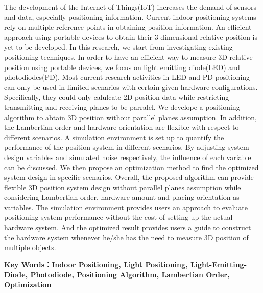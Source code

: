 \begin{abstractEN}

    The development of the Internet of Things(IoT) increases the demand of sensors and data, especially positioning information. Current indoor positioning systems rely on multiple reference points in obtaining position information. An  efficient approach using portable devices to obtain their 3-dimensional relative position is yet to be developed. In this research, we start from investigating existing positioning techniques. In order to have an efficient way to measure 3D relative position using portable devices, we focus on light emitting diode(LED) and photodiodes(PD). Most current research activities in LED and PD positioning can only be used in limited scenarios with certain given hardware configurations. Specifically, they could only calulcate 2D position data while restricting transmitting and receiving planes to be parralel. We develope a positioning algorithm to abtain 3D position without parallel planes assumption. In addition, the Lambertian order and hardware orientation are flexible with respect to different scenarios. A simulation environment is set up to quantify the performance of the position system in different scenarios. By adjusting system design variables and simulated noise respectively, the influence of each variable can be discussed. We then propose an optimization method to find the optimized system design in specific scenarios. Overall, the proposed algorithm can provide flexible 3D position system design without parallel planes assumption while considering Lambertian order, hardware amount and placing orientation as variables. The simulation environment provides users an approach to evaluate positioning system performance without the cost of setting up the actual hardware system. And the optimized result provides users a guide to construct the hardware system whenever he/she has the need to measure 3D position of multiple objects. 

    \vspace{1cm}
    \noindent \textbf{Key Words：Indoor Positioning, Light Positioning, Light-Emitting-Diode, Photodiode, Positioning Algorithm, Lambertian Order, Optimization}

\end{abstractEN}
